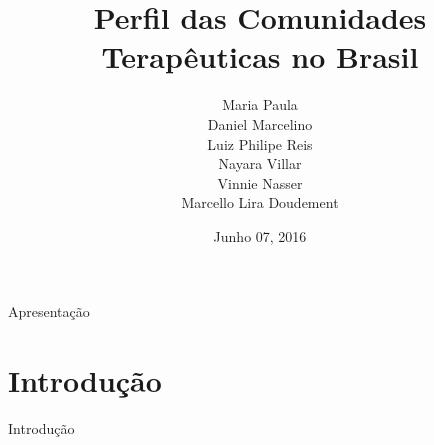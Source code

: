 
\pgfplotsset{compat=1.11}

\title{Perfil das Comunidades Terapêuticas no Brasil}
\date{Junho 07, 2016}
\author{Maria Paula \\ Daniel Marcelino \\ Luiz Philipe Reis \\
Nayara Villar \\ Vinnie Nasser \\ Marcello Lira Doudement
}






\begin{frame}
\maketitle
\end{frame}



\begin{frame}{Apresentação}
\tableofcontents
\end{frame}



\section{Introdução}
\begin{frame}{Introdução}

\end{frame}



